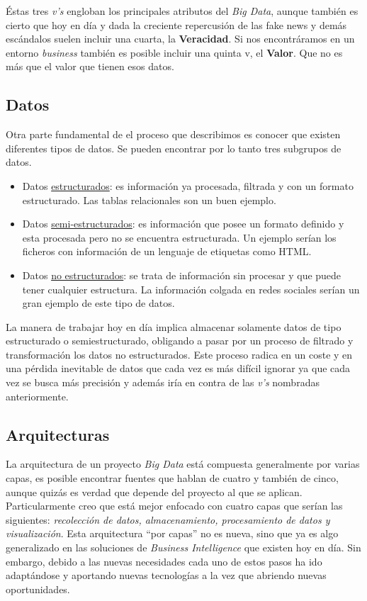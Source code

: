 Éstas tres \textit{v's} engloban los principales atributos del \emph{Big Data}, aunque también es cierto que hoy en día y dada la creciente repercusión de las fake news y demás escándalos suelen incluir una cuarta, la \textbf{Veracidad}. Si nos encontráramos en un entorno \textit{business} también es posible incluir una quinta v, el \textbf{Valor}. Que no es más que el valor que tienen esos datos. 

\subsection{Datos}
Otra parte fundamental de el proceso que describimos es conocer que existen diferentes tipos de datos. Se pueden encontrar por lo tanto tres subgrupos de datos.
\begin{itemize}
	\tightlist
	\item	Datos \underline {estructurados}: es información ya procesada, filtrada y con un formato estructurado. Las tablas relacionales son un buen ejemplo.
	\item	Datos \underline {semi-estructurados}: es información que posee un formato definido y esta procesada pero no se encuentra estructurada. Un ejemplo serían los ficheros con información de un lenguaje de etiquetas como HTML.
	\item Datos \underline {no estructurados}: se trata de información sin procesar y que puede tener cualquier estructura. La información colgada en redes sociales serían un gran ejemplo de este tipo de datos.
\end{itemize}
La manera de trabajar hoy en día implica almacenar solamente datos de tipo estructurado o semiestructurado, obligando a pasar por un proceso de filtrado y transformación los datos no estructurados. Este proceso radica en un coste y en una pérdida inevitable de datos que cada vez es más difícil ignorar ya que cada vez se busca más precisión y además iría en contra de las \textit{v’s} nombradas anteriormente.

\subsection{Arquitecturas}

La arquitectura de un proyecto \emph{Big Data} está compuesta generalmente por varias capas, es posible encontrar fuentes que hablan de cuatro y también de cinco, aunque quizás es verdad que depende del proyecto al que se aplican. Particularmente creo que está mejor enfocado con cuatro capas que serían las siguientes: \emph{recolección de datos, almacenamiento, procesamiento de datos y visualización}. Esta arquitectura “por capas” no es nueva, sino que ya es algo generalizado en las soluciones de \textit{Business Intelligence} que existen hoy en día. Sin embargo, debido a las nuevas necesidades cada uno de estos pasos ha ido adaptándose y aportando nuevas tecnologías a la vez que abriendo nuevas oportunidades.

